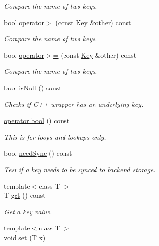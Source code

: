 \begin{DoxyCompactItemize}
\begin{DoxyCompactList}\small\item\em Compare the name of two keys. \end{DoxyCompactList}\item 
bool \hyperlink{classkdb_1_1Key_af616a48861b70b93e6f5955206c9257e}{operator$>$} (const \hyperlink{classkdb_1_1Key}{Key} \&other) const
\begin{DoxyCompactList}\small\item\em Compare the name of two keys. \end{DoxyCompactList}\item 
bool \hyperlink{classkdb_1_1Key_a4e711165a33a127d95f7102307e94bf6}{operator$>$=} (const \hyperlink{classkdb_1_1Key}{Key} \&other) const
\begin{DoxyCompactList}\small\item\em Compare the name of two keys. \end{DoxyCompactList}\item 
bool \hyperlink{classkdb_1_1Key_ab70b89caae5fe1e9a2e774733576fa4c}{is\+Null} () const
\begin{DoxyCompactList}\small\item\em Checks if C++ wrapper has an underlying key. \end{DoxyCompactList}\item 
\hyperlink{classkdb_1_1Key_a15ee99e8447ee526d600e15938e4a1c0}{operator bool} () const
\begin{DoxyCompactList}\small\item\em This is for loops and lookups only. \end{DoxyCompactList}\item 
bool \hyperlink{classkdb_1_1Key_add635e6194c7a05b7d4e470f7b135d9c}{need\+Sync} () const
\begin{DoxyCompactList}\small\item\em Test if a key needs to be synced to backend storage. \end{DoxyCompactList}\item 
{\footnotesize template$<$class T $>$ }\\T \hyperlink{classkdb_1_1Key_ac558a1f1b2cb50d77fbabcbb24950c05}{get} () const
\begin{DoxyCompactList}\small\item\em Get a key value. \end{DoxyCompactList}\item 
{\footnotesize template$<$class T $>$ }\\void \hyperlink{classkdb_1_1Key_a615124f0a2b291e03975b49c233654d7}{set} (T x)

\end{DoxyCompactItemize}
